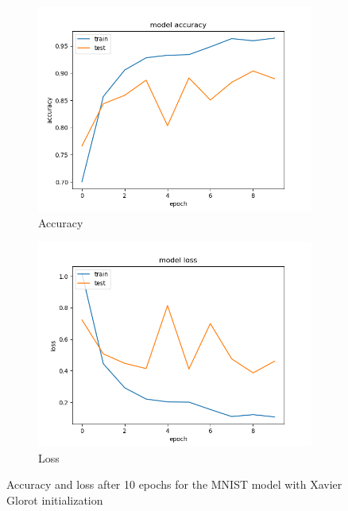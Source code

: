 \documentclass{article}
\theoremstyle{definition}
\theoremstyle{remark}
\begin{document}
\begin{figure}[h!]
\centering
\begin{subfigure}{.5\textwidth}
  \centering
  \includegraphics[width=1.2\linewidth]{img/baseline_models/mnist_acc.png}
  \caption{Accuracy}
  \label{fig:sub1}
\end{subfigure}%
\begin{subfigure}{.5\textwidth}
  \centering
  \includegraphics[width=1.2\linewidth]{img/baseline_models/mnist_loss.png}
  \caption{Loss}
  \label{fig:sub2}
\end{subfigure}
\caption{Accuracy and loss after 10 epochs for the MNIST model with Xavier Glorot initialization}
\label{fig:mnist_ten_epochs}
\end{figure}
\end{document}

